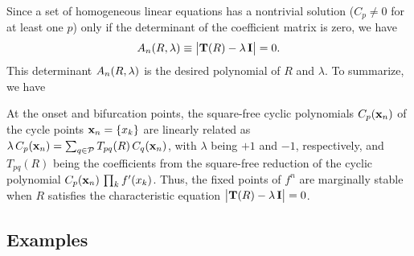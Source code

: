 \documentclass{ws-ijbc}
\begin{document}
Since a set of homogeneous linear equations
  has a nontrivial solution
  ($C_p \ne 0$ for at least one $p$)
  only if the determinant of the coefficient matrix
  is zero, we have
\begin{equation}
  A_n(R, \lambda) \equiv \big| \mathbf{T}(R) - \lambda \, \mathbf{I} \big| = 0.
\label{eq:xr}
\end{equation}
%
This determinant $A_n(R, \lambda)$
  is the desired polynomial of $R$ and $\lambda$.
%
%
To summarize, we have
\begin{theorem}
  At the onset and bifurcation points,
  the square-free cyclic polynomials $C_p(\mathbf{x}_{n})$
  of the cycle points $\mathbf{x}_{n} = \{x_k\}$
  are linearly related as
  $\lambda \, C_p(\mathbf{x}_{n}) = \sum_{q \in \mathcal P} T_{pq}(R) \, C_q(\mathbf{x}_{n})$,
  with $\lambda$ being $+1$ and $-1$, respectively,
  and $T_{pq}(R)$ being the coefficients
  from the square-free reduction of the cyclic polynomial
  $C_p(\mathbf{x}_{n}) \, \prod_k f'(x_k)$. %
  Thus, the fixed points of $f^n$
  are marginally stable when $R$ satisfies
  the characteristic equation
  $\big| \mathbf{T}(R) - \lambda \, \mathbf{I} \big| = 0$.
  \label{thm:main}
\end{theorem}






\subsection{\label{sec:examples}Examples}
\end{document}
